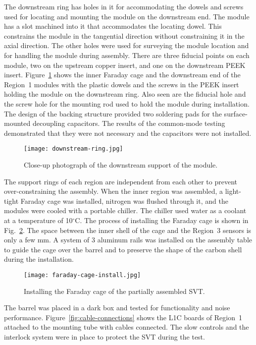 The downstream ring has holes in it for accommodating the dowels and screws used for locating and mounting the
module on the downstream end. The module has a slot machined into it that accommodates the locating dowel. This
constrains the module in the tangential direction without constraining it in the axial direction. The other holes were
used for surveying the module location and for handling the module during assembly. There are three fiducial points
on each module, two on the upstream copper insert, and one on the downstream PEEK insert.
Figure~\ref{fig:downstream-ring} shows the inner Faraday cage and the downstream end of the Region~1 modules
with the plastic dowels and the screws in the PEEK insert holding the module on the downstream ring. Also seen are
the fiducial hole and the screw hole for the mounting rod used to hold the module during installation. The design of
the backing structure provided two soldering pads for the surface-mounted decoupling capacitors. The results of
the common-mode testing demonstrated that they were not necessary and the capacitors were not installed.

\begin{figure}[h] 
\centering 
\texttt{[image: downstream-ring.jpg]}
\caption{Close-up photograph of the downstream support of the module.}
\label{fig:downstream-ring}
\end{figure}

The support rings of each region are independent from each other to prevent over-constraining the assembly. When
the inner region was assembled, a light-tight Faraday cage was installed, nitrogen was flushed through it, and the
modules were cooled with a portable chiller. The chiller used water as a coolant at a temperature of 10$^\circ$C.
The process of installing the Faraday cage is shown in Fig.~\ref{fig:faraday-cage-install}. The space between the
inner shell of the cage and the Region~3 sensors is only a few mm. A system of 3 aluminum rails was installed on the
assembly table to guide the cage over the barrel and to preserve the shape of the carbon shell during the installation. 

\begin{figure}[h] 
\centering 
\texttt{[image: faraday-cage-install.jpg]}
\caption{Installing the Faraday cage of the partially assembled SVT.}
\label{fig:faraday-cage-install}
\end{figure}

The barrel was placed in a dark box and tested for functionality and noise performance.
Figure~\ref{fig:cable-connections} shows the L1C boards of Region~1 attached to the mounting tube with cables
connected. The slow controls and the interlock system were in place to protect the SVT during the test.

